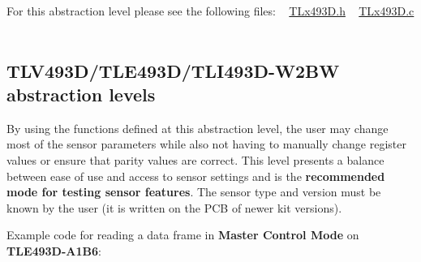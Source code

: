 For this abstraction level please see the following files\+: ~\newline
 \mbox{\hyperlink{_t_lx493_d_8h}{T\+Lx493\+D.\+h}} ~\newline
 \mbox{\hyperlink{_t_lx493_d_8c}{T\+Lx493\+D.\+c}} ~\newline
\hypertarget{index_s1s2}{}\subsection{T\+L\+V493\+D/\+T\+L\+E493\+D/\+T\+L\+I493\+D-\/\+W2\+B\+W abstraction levels}\label{index_s1s2}
By using the functions defined at this abstraction level, the user may change most of the sensor parameters while also not having to manually change register values or ensure that parity values are correct. This level presents a balance between ease of use and access to sensor settings and is the {\bfseries recommended mode for testing sensor features}. The sensor type and version must be known by the user (it is written on the P\+CB of newer kit versions).~\newline


Example code for reading a data frame in {\bfseries Master Control Mode} on {\bfseries T\+L\+E493\+D-\/\+A1\+B6}\+: ~\newline
 
